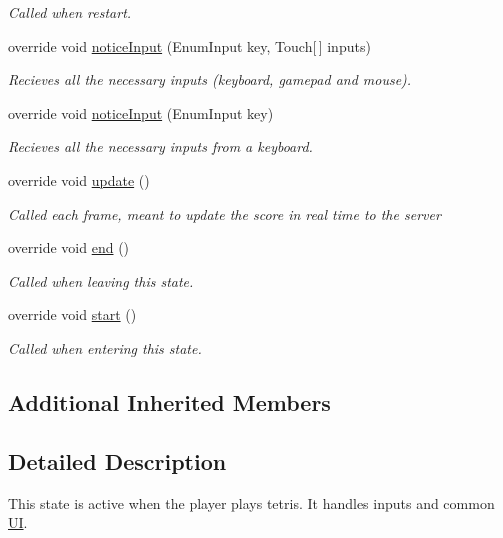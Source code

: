 \begin{DoxyCompactItemize}
\begin{DoxyCompactList}\small\item\em Called when restart. \end{DoxyCompactList}\item 
override void \hyperlink{class_tetris_state_a28374d970db4eb1f849030fcc866210e}{notice\-Input} (Enum\-Input key, Touch\mbox{[}$\,$\mbox{]} inputs)
\begin{DoxyCompactList}\small\item\em Recieves all the necessary inputs (keyboard, gamepad and mouse). \end{DoxyCompactList}\item 
override void \hyperlink{class_tetris_state_a7e4530c7f30e019c3ab8d9e8d7d3b673}{notice\-Input} (Enum\-Input key)
\begin{DoxyCompactList}\small\item\em Recieves all the necessary inputs from a keyboard.\end{DoxyCompactList}\item 
override void \hyperlink{class_tetris_state_aa522101ff32603e24c232141799ef6f1}{update} ()
\begin{DoxyCompactList}\small\item\em Called each frame, meant to update the score in real time to the server \end{DoxyCompactList}\item 
override void \hyperlink{class_tetris_state_a65439e531d3d0d1b7c5d9bd17b28beb5}{end} ()
\begin{DoxyCompactList}\small\item\em Called when leaving this state. \end{DoxyCompactList}\item 
override void \hyperlink{class_tetris_state_a1e02603c08500919b3d47917396ffed8}{start} ()
\begin{DoxyCompactList}\small\item\em Called when entering this state. \end{DoxyCompactList}\end{DoxyCompactItemize}
\subsection*{Additional Inherited Members}


\subsection{Detailed Description}
This state is active when the player plays tetris. It handles inputs and common \hyperlink{class_u_i}{U\-I}. 



